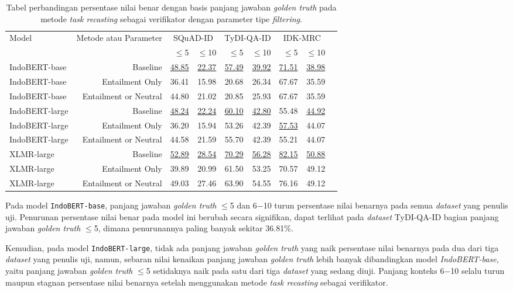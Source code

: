 \begin{table}[H]\centering
\small
\begin{tabular}{lrrrrrrrr}\toprule
\multirow{2}{*}{Model} &\multirow{2}{*}{Metode atau Parameter} &\multicolumn{2}{c}{SQuAD-ID} &\multicolumn{2}{c}{TyDI-QA-ID} &\multicolumn{2}{c}{IDK-MRC} \\\cmidrule{3-8}
& &$\leq$5 &$\leq$10 &$\leq$5 &$\leq$10 &$\leq$5 &$\leq$10 \\\midrule
IndoBERT-base &Baseline &\underline{48.85} &\underline{22.37} &\underline{57.49} &\underline{39.92} &\underline{71.51} &\underline{38.98} \\
IndoBERT-base &Entailment Only &36.41 &15.98 &20.68 &26.34 &67.67 &35.59 \\
IndoBERT-base &Entailment or Neutral &44.80 &21.02 &20.85 &25.93 &67.67 &35.59 \\
\hline
IndoBERT-large &Baseline &\underline{48.24} &\underline{22.24} &\underline{60.10} &\underline{42.80} &55.48 &\underline{44.92} \\
IndoBERT-large &Entailment Only &36.20 &15.94 &53.26 &42.39 &\underline{57.53} &44.07 \\
IndoBERT-large &Entailment or Neutral &44.58 &21.59 &55.70 &42.39 &55.21 &44.07 \\
\hline
XLMR-large &Baseline &\underline{52.89} &\underline{28.54} &\underline{70.29} &\underline{56.28} &\underline{82.15} &\underline{50.88} \\
XLMR-large &Entailment Only &39.89 &20.99 &61.50 &53.25 &70.57 &49.12 \\
XLMR-large &Entailment or Neutral &49.03 &27.46 &63.90 &54.55 &76.16 &49.12 \\
\bottomrule
\end{tabular}
\caption{Tabel perbandingan persentase nilai benar dengan basis panjang jawaban \emph{golden truth} pada metode \emph{task recasting} sebagai verifikator dengan parameter tipe \emph{filtering}.}
\end{table}

Pada model \texttt{IndoBERT-base}, panjang jawaban \emph{golden truth} $\leq$5 dan 6$-$10 turun persentase nilai benarnya pada semua \emph{dataset} yang penulis uji. Penurunan persentase nilai benar pada model ini berubah secara signifikan, dapat terlihat pada \emph{dataset} TyDI-QA-ID bagian panjang jawaban \emph{golden truth} $\leq$5, dimana penurunannya paling banyak sekitar 36.81\%.

Kemudian, pada model \texttt{IndoBERT-large}, tidak ada panjang jawaban \emph{golden truth} yang naik persentase nilai benarnya pada dua dari tiga \emph{dataset} yang penulis uji, namun, sebaran nilai kenaikan panjang jawaban \emph{golden truth} lebih banyak dibandingkan model \emph{IndoBERT-base}, yaitu panjang jawaban \emph{golden truth}  $\leq$5 setidaknya naik pada satu dari tiga \emph{dataset} yang sedang diuji. Panjang konteks  6$-$10 selalu turun maupun stagnan persentase nilai benarnya setelah menggunakan metode \emph{task recasting} sebagai verifikator.

